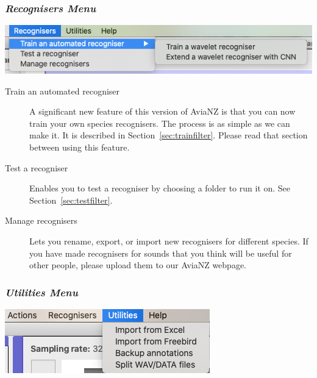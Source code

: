 \documentclass{article}
\begin{document}
\subsubsection{{\em Recognisers Menu}}

\begin{center}
\includegraphics[width=.7\textwidth]{Figures/RecognisersMenu}
\end{center}

\begin{description}
\item [Train an automated recogniser] A significant new feature of this version of AviaNZ is that you can now train your own species recognisers. The process is as simple as we can make it. It is described in Section~\ref{sec:trainfilter}. Please read that section between using this feature.
\item [Test a recogniser] Enables you to test a recogniser by choosing a folder to run it on. See Section~\ref{sec:testfilter}.
\item[Manage recognisers] Lets you rename, export, or import new recognisers for different species. 
If you have made recognisers for sounds that you think will be useful for other people, please upload them to our AviaNZ webpage.   
\end{description}

\subsubsection{{\em Utilities Menu} \label{sec:utilities}}

\begin{center}
\includegraphics[width=.4\textwidth]{Figures/UtilitiesMenu}
\end{center}
\end{document}
